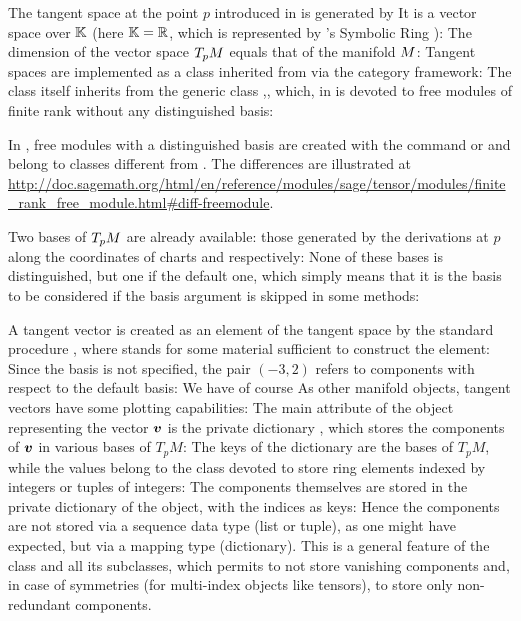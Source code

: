 The tangent space at the point $p$ introduced in  is generated by
It is a vector space over $\mathbb{K}$ (here $\mathbb{K}=\mathbb{R}$, which is represented by \Sage{}'s Symbolic
Ring ):
The dimension of the vector space $T_pM$ equals that of the manifold $M$:
Tangent spaces are implemented as a class inherited from 
via the category framework:
The class  itself inherits from the generic class
,, which, in \Sage{} is devoted to free modules of finite rank
without any distinguished basis:
\begin{remark}
In \Sage{}, free modules with a distinguished basis
are created with the command  or 
and belong to classes different from .
The differences are illustrated at\\
{\scriptsize \url{http://doc.sagemath.org/html/en/reference/modules/sage/tensor/modules/finite_rank_free_module.html#diff-freemodule}}.
\end{remark}

Two bases of $T_pM$ are already available: those generated by the derivations
at $p$ along the coordinates of charts  and  respectively:
None of these bases is distinguished, but one if the default one, which
simply means that it is the basis to be considered if the basis argument
is skipped in some methods:

A tangent vector is created as an element of the tangent space by the
standard \Sage{} procedure
, where 
stands for some material sufficient to construct the element:
Since the basis is not specified, the pair $(-3,2)$ refers to components
with respect to the default basis:
We have of course
As other manifold objects, tangent vectors have some plotting capabilities:
The main attribute of the object  representing the vector $\bm{v}$ is the
private dictionary , which stores the components of $\bm{v}$ in various bases of $T_p M$:
The keys of the dictionary  are the bases of $T_p M$, while the values belong to the class  devoted to store ring elements indexed by integers or tuples of integers:
The components themselves are stored in the private dictionary  of the  object, with the indices as keys:
Hence the components are not stored via a sequence data type (list or tuple), as
one might have expected, but via a mapping type (dictionary). This is a general
feature of the class  and all its subclasses, which permits
to not store vanishing components and, in case of symmetries (for multi-index
objects like tensors), to store only non-redundant components.

